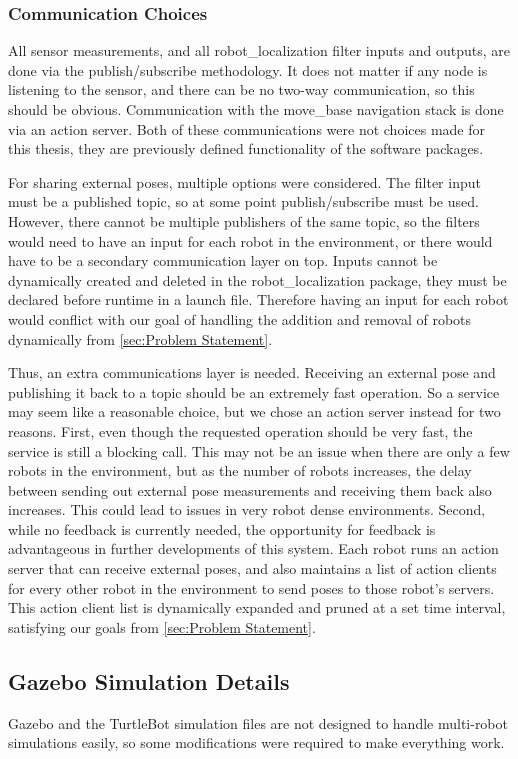 \documentclass[thesis.tex]{subfile}
\begin{document}
\subsubsection{Communication Choices}
All sensor measurements, and all robot\_localization filter inputs and outputs, are done via the publish/subscribe methodology. It does not matter if any \gls{node} is listening to the sensor, and there can be no two-way communication, so this should be obvious. Communication with the move\_base navigation stack is done via an action server. Both of these communications were not choices made for this thesis, they are previously defined functionality of the software packages.

For sharing external poses, multiple options were considered. The filter input must be a published topic, so at some point publish/subscribe must be used. However, there cannot be multiple publishers of the same topic, so the filters would need to have an input for each robot in the environment, or there would have to be a secondary communication layer on top. Inputs cannot be dynamically created and deleted in the robot\_localization package, they must be declared before runtime in a launch file. Therefore having an input for each robot would conflict with our goal of handling the addition and removal of robots dynamically from \cref{sec:Problem Statement}.

Thus, an extra communications layer is needed. Receiving an external pose and publishing it back to a topic should be an extremely fast operation. So a service may seem like a reasonable choice, but we chose an action server instead for two reasons. First, even though the requested operation should be very fast, the service is still a blocking call. This may not be an issue when there are only a few robots in the environment, but as the number of robots increases, the delay between sending out external pose measurements and receiving them back also increases. This could lead to issues in very robot dense environments. Second, while no feedback is currently needed, the opportunity for feedback is advantageous in further developments of this system. Each robot runs an action server that can receive external poses, and also maintains a list of action clients for every other robot in the environment to send poses to those robot's servers. This action client list is dynamically expanded and pruned at a set time interval, satisfying our goals from \cref{sec:Problem Statement}.

\subsection{Gazebo Simulation Details} \label{sec:sim_details}
Gazebo and the TurtleBot simulation files are not designed to handle multi-robot simulations easily, so some modifications were required to make everything work.
\end{document}
